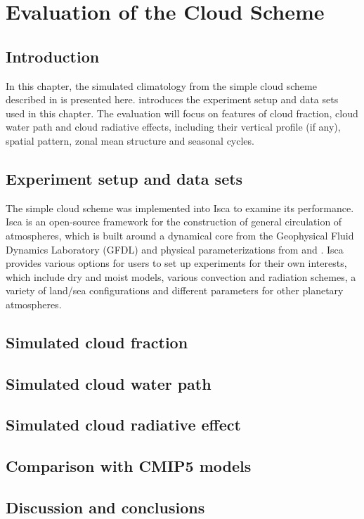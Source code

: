 \chapter{Evaluation of the Cloud Scheme}

\section{Introduction}

In this chapter, the simulated climatology from the simple cloud scheme described in  is presented here.  introduces the experiment setup and data sets used in this chapter. The evaluation will focus on features of cloud fraction, cloud water path and cloud radiative effects, including their vertical profile (if any), spatial pattern, zonal mean structure and seasonal cycles.


\section{Experiment setup and data sets}
\label{sec:exp_setup_and_dataset}

The simple cloud scheme was implemented into Isca \citep{Vallis2018} to examine its performance. Isca is an open-source framework for the construction of general circulation of atmospheres, which is built around a dynamical core from the Geophysical Fluid Dynamics Laboratory (GFDL) and physical parameterizations from \citet{Frierson2006} and \citet{Frierson2007}. Isca provides various options for users to set up experiments for their own interests, which include dry and moist models, various convection and radiation schemes, a variety of land/sea configurations and different parameters for other planetary atmospheres.

\section{Simulated cloud fraction}

\section{Simulated cloud water path}

\section{Simulated cloud radiative effect}

\section{Comparison with CMIP5 models}

\section{Discussion and conclusions}

